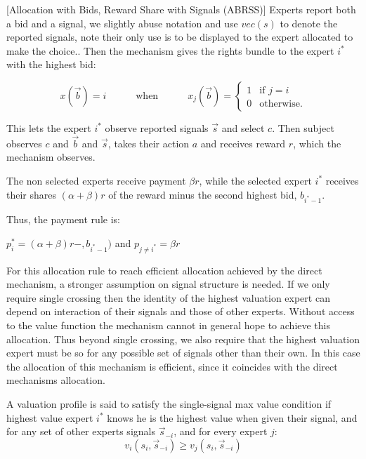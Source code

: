 \begin{mech}\label{mech:Direct}[Allocation with Bids, Reward Share with Signals (ABRSS)]
	Experts report both a bid and a signal, we slightly abuse notation and use $vec(s)$ to denote the reported signals, note their only use is to be displayed to the expert allocated to make the choice..
	Then the mechanism gives the rights bundle to the expert $i^*$ with the highest bid:
	
	$$x(\vec{b}) = i \quad \quad\quad \text{when} \quad\quad\quad x_j(\vec{b}) = \begin{cases} 1 & \text{if } j=i \\ 0 & \text{otherwise.} \end{cases}$$
	
	This lets the expert $i^*$ observe reported signals $\vec{s}$ and select $c$.
	Then subject observes $c$ and $\vec{b}$ and $\vec{s}$, takes their action $a$ and receives reward $r$, which the mechanism observes. 
	
	The non selected experts receive  payment $\beta r$, while the selected expert $i^*$ receives their shares $(\alpha + \beta) r$ of the reward minus the second highest bid, $b_{i^*-1}$.

	Thus, the payment rule is:
	
	$p_i^*= (\alpha + \beta)r - ,b_{i^*-1})$ and $p_{j\neq i^*} = \beta r$
\end{mech}



For this allocation rule to reach efficient allocation achieved by the direct mechanism, a stronger assumption on signal structure is needed. If we only require single crossing then the identity of the highest valuation expert can depend on interaction of their signals and those of other experts. Without access to the value function the mechanism cannot in general hope to achieve this allocation.
Thus beyond single crossing, we also require that the highest valuation expert must be so for any possible set of signals other than their own. In this case the allocation of this mechanism is efficient, since it coincides with the direct mechanisms allocation.


\begin{defn}
	A valuation profile is said to satisfy the single-signal max value condition if highest value expert $i^*$ knows he is the highest value when given their signal, and for any set of other experts  signals $\vec{s}_{-i}$, and for every expert $j$: $$v_i(s_i, \vec{s}_{-i}) \geq  v_j(s_i, \vec{s}_{-i})$$
\end{defn}


